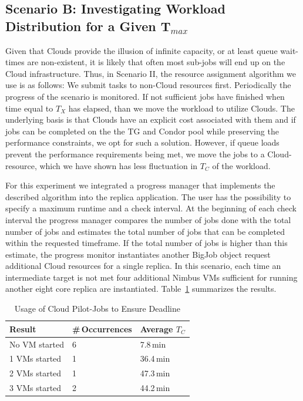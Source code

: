 \documentclass[conference,final]{IEEEtran}
\newcommand{\up}{\vspace*{-1em}}
\newcommand{\tmax}{$T_{max}$ }
\newcommand{\tc}{$T_{C}$ }
\begin{document}
\subsection{Scenario B: Investigating Workload Distribution for a Given T$_{max}$}
\up

Given that Clouds provide the illusion of infinite capacity, or at
least queue wait-times are non-existent, it is likely that often most
sub-jobs will end up on the Cloud infrastructure.  Thus, in Scenario
II, the resource assignment algorithm we use is as follows: We submit
tasks to non-Cloud resources first. Periodically the progress of the
scenario is monitored. If not sufficient jobs have finished
when time equal to $T_{X}$ has elapsed,
than we move the workload to utilize Clouds.  The
underlying basis is that Clouds have an explicit cost associated with
them and if jobs can be completed on the the TG and Condor pool while
preserving the performance constraints, we opt for such a
solution. However, if queue loads prevent the performance requirements
being met, we move the jobs to a Cloud-resource, which we have shown
has less fluctuation in \tc of the workload.

For this experiment we integrated a progress manager that implements
the described algorithm into the replica application.  The user has
the possibility to specify a maximum runtime and a check interval.  At
the beginning of each check interval the progress manager compares the
number of jobs done with the total number of jobs and estimates the
total number of jobs that can be completed within the requested
timeframe. If the total number of jobs is higher than this estimate,
the progress monitor instantiates another BigJob object request
additional Cloud resources for a single replica.  In this scenario,
each time an intermediate target is not met four additional Nimbus VMs
sufficient for running another eight core replica are instantiated.
Table~\ref{tab:app_deadline} summarizes the results.

\begin{table}[ht]
    \centering
	\begin{tabular}{|l|l|l|}
	\hline
    Result & \#\,Occurrences &Average \tc \\ \hline
	No VM started &6 &7.8\,min\\ \hline
	1 VMs started &1 &36.4\,min\\ \hline
	2 VMs started &1 &47.3\,min\\ \hline
	3 VMs started &2 &44.2\,min\\ \hline
	\end{tabular}
	\caption{Usage of Cloud Pilot-Jobs to Ensure Deadline \label{tab:app_deadline}\up}
\end{table}
\end{document}
